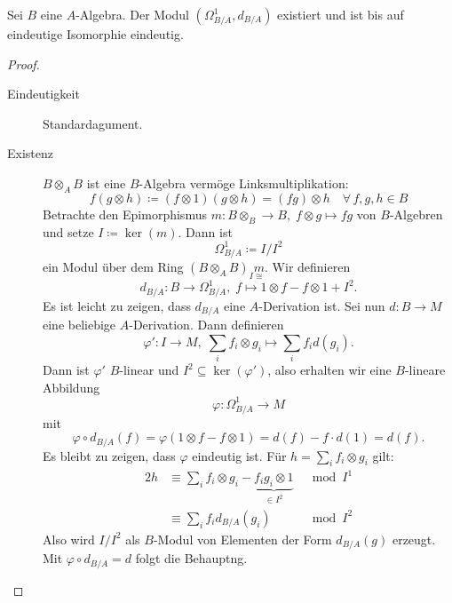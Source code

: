 \begin{lem}
\label{lem:13.3}
	Sei $B$ eine $A$-Algebra. Der Modul $(\Omega^1_{B/A},d_{B/A})$ existiert und ist bis auf eindeutige Isomorphie eindeutig.
	\begin{proof}
		\begin{description}
			\item[Eindeutigkeit] Standardagument.
			\item[Existenz] $B \otimes_A B$ ist eine $B$-Algebra vermöge Linksmultiplikation:
			\[
				f(g\otimes h) \coloneqq (f\otimes 1)(g \otimes h) = (fg)\otimes h \quad \forall\, f,g,h\in B
			\]
			Betrachte den Epimorphismus $m\colon B\otimes_B\to B,\; f\otimes g \mapsto fg$ von $B$-Algebren und setze $I \coloneqq \ker(m)$. Dann ist
			\[
				\Omega_{B/A}^1 \coloneqq I/I^2
			\]
			ein Modul über dem Ring $(B\otimes_A B)_I \underset{\cong}{m}$. Wir definieren
			\[
				d_{B/A}\colon B \to \Omega_{B/A}^1,\; f \mapsto 1 \otimes f - f \otimes 1 + I^2.
			\]
			Es ist leicht zu zeigen, dass $d_{B/A}$ eine $A$-Derivation ist. Sei nun $d\colon B \to M$ eine beliebige $A$-Derivation. Dann definieren
			\[
				\varphi'\colon I \to M,\; \sum_{i}f_i\otimes g_i \mapsto \sum_{i}f_id(g_i).
			\]
			Dann ist $\varphi'$ $B$-linear und $I^2\subseteq \ker(\varphi')$, also erhalten wir eine $B$-lineare Abbildung
			\[
				\varphi\colon \Omega_{B/A}^1\to M
			\]
			mit
			\[
				\varphi\circ d_{B/A}(f) = \varphi(1\otimes f- f\otimes 1) = d(f) - f\cdot d(1) = d(f).
			\]
			Es bleibt zu zeigen, dass $\varphi$ eindeutig ist. Für $h = \sum_{i}f_i\otimes g_i$ gilt:
			\begin{alignat*}{2}
				h &\equiv \sum_i f_i \otimes g_i - \underbrace{f_ig_i \otimes 1}_{\in I^2}& \mod I^1\\
				&\equiv \sum_i f_i d_{B/A}(g_i) & \mod I^2
			\end{alignat*}
			Also wird $I/I^2$ als $B$-Modul von Elementen der Form $d_{B/A}(g)$ erzeugt. Mit $\varphi \circ d_{B/A}=d$ folgt die Behauptng.
		\end{description}
	\end{proof}
\end{lem}

